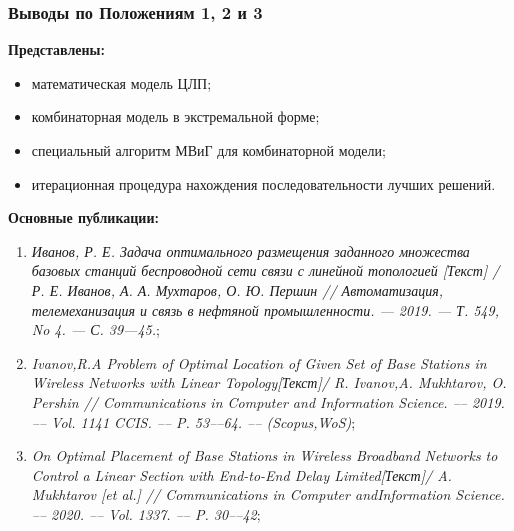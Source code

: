 \begin{frame}
    \frametitle{Выводы по Положениям 1, 2 и 3}
    \fontsize{8pt}{7.2}\selectfont

    \textbf{Представлены:}
    \begin{itemize}
        \item математическая модель ЦЛП;
        \item комбинаторная модель в экстремальной форме;
        \item специальный алгоритм МВиГ для комбинаторной модели;
        \item итерационная процедура нахождения последовательности лучших решений.
    \end{itemize}

    \bigskip
    \textbf{Основные публикации:}
    \begin{minipage}[c]{1\linewidth}
        \fontsize{4pt}{5.2}\selectfont
        \begin{enumerate}
            \item \textit{Иванов, Р. Е. Задача оптимального размещения заданного множества базовых станций беспроводной сети связи с линейной топологией [Текст] / Р. Е. Иванов, А. А. Мухтаров, О. Ю. Першин // Автоматизация, телемеханизация и связь в нефтяной промышленности. — 2019. — Т. 549, No 4. — С. 39—45.};
            
            \item \textit{Ivanov,R.A Problem of Optimal Location of Given Set of Base Sta­tions in Wireless Networks with Linear Topology[Текст]/ R. Ivanov,A. Mukhtarov, O. Pershin // Communications in Computer and Infor­mation Science. –– 2019. –– Vol. 1141 CCIS. –– P. 53––64. –– (Scopus,WoS)};
            
            \item \textit{On Optimal Placement of Base Stations in Wireless Broadband Net­works to Control a Linear Section with End-to-End Delay Limited[Текст]/ A. Mukhtarov [et al.] // Communications in Computer andInformation Science. –– 2020. –– Vol. 1337. –– P. 30––42};
            

\end{enumerate}
\end{minipage}
\end{frame}
